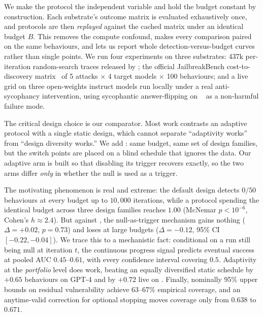  We make the protocol the independent variable and hold the budget constant
by construction. Each substrate's outcome matrix is evaluated exhaustively once, and protocols
are then \emph{replayed} against the cached matrix under an identical budget $B$. This removes
the compute confound, makes every comparison paired on the same behaviours, and lets us report
whole detection-versus-budget curves rather than single points. We run four experiments on three
substrates: 437k per-iteration random-search traces released by
\citet{andriushchenko2024adaptive}; the official JailbreakBench cost-to-discovery
matrix~\cite{chao2024jbb} of 5 attacks $\times$ 4 target models $\times$ 100 behaviours; and a
live grid on three open-weights instruct models run locally under a real anti-sycophancy
intervention, using sycophantic answer-flipping on \gsmk~\cite{cobbe2021gsm8k} as a non-harmful
failure mode.

The critical design choice is our comparator. Most work contrasts an adaptive protocol with a
single static design, which cannot separate ``adaptivity works'' from ``design diversity
works.'' We add \fixedsplit: same budget, same set of design families, but the switch points are
placed on a blind schedule that ignores the data. Our adaptive arm \ladder is built so that
disabling its trigger recovers \fixedsplit exactly, so the two arms differ \emph{only} in
whether the null is used as a trigger.

 The motivating phenomenon is real and extreme: the default design detects
$0/50$ behaviours at every budget up to $10{,}000$ iterations, while a protocol spending the
identical budget across three design families reaches $1.00$ (McNemar $p<10^{-6}$, Cohen's
$h \approx 2.4$). But against \fixedsplit, the null-as-trigger mechanism gains nothing
($\Delta = +0.02$, $p = 0.73$) and loses at large budgets ($\Delta = -0.12$, 95\% CI
$[-0.22, -0.04]$). We trace this to a mechanistic fact: conditional on a run still being null at
iteration $t$, the continuous progress signal predicts eventual success at pooled AUC
$0.45$--$0.61$, with every confidence interval covering $0.5$. Adaptivity at the \emph{portfolio}
level does work, beating an equally diversified static schedule by $+0.65$ behaviours on GPT-4
and by $+0.72$ live on \qwenseven. Finally, nominally 95\% upper bounds on residual vulnerability
achieve 63--67\% empirical coverage, and an anytime-valid correction for optional stopping moves
coverage only from $0.638$ to $0.671$.

